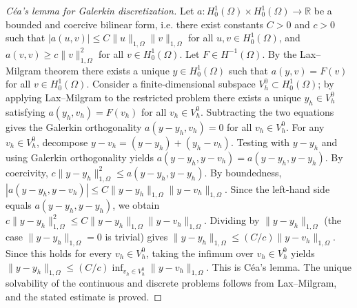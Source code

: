 \documentclass{article}
\begin{document}
\begin{proof}[C\'ea's lemma for Galerkin discretization]
Let $a: H^1_0(\Omega) \times H^1_0(\Omega) \to \mathbb{R}$ be a bounded and coercive bilinear form, i.e. there exist constants $C > 0$ and $c > 0$ such that $|a(u,v)| \le C \|u\|_{1,\Omega} \|v\|_{1,\Omega}$ for all $u,v \in H^1_0(\Omega)$, and $a(v,v) \ge c \|v\|_{1,\Omega}^2$ for all $v \in H^1_0(\Omega)$. Let $F \in H^{-1}(\Omega)$. By the Lax--Milgram theorem there exists a unique $y \in H^1_0(\Omega)$ such that $a(y,v) = F(v)$ for all $v \in H^1_0(\Omega)$. Consider a finite-dimensional subspace $V^0_h \subset H^1_0(\Omega)$; by applying Lax--Milgram to the restricted problem there exists a unique $y_h \in V^0_h$ satisfying $a(y_h,v_h) = F(v_h)$ for all $v_h \in V^0_h$. Subtracting the two equations gives the Galerkin orthogonality $a(y - y_h, v_h) = 0$ for all $v_h \in V^0_h$. For any $v_h \in V^0_h$, decompose $y - v_h = (y - y_h) + (y_h - v_h)$. Testing with $y - y_h$ and using Galerkin orthogonality yields $a(y - y_h, y - v_h) = a(y - y_h, y - y_h)$. By coercivity, $c \|y - y_h\|_{1,\Omega}^2 \le a(y - y_h, y - y_h)$. By boundedness, $|a(y - y_h, y - v_h)| \le C \|y - y_h\|_{1,\Omega} \|y - v_h\|_{1,\Omega}$. Since the left-hand side equals $a(y - y_h, y - y_h)$, we obtain $c \|y - y_h\|_{1,\Omega}^2 \le C \|y - y_h\|_{1,\Omega} \|y - v_h\|_{1,\Omega}$. Dividing by $\|y - y_h\|_{1,\Omega}$ (the case $\|y - y_h\|_{1,\Omega} = 0$ is trivial) gives $\|y - y_h\|_{1,\Omega} \le (C/c) \|y - v_h\|_{1,\Omega}$. Since this holds for every $v_h \in V^0_h$, taking the infimum over $v_h \in V^0_h$ yields $\|y - y_h\|_{1,\Omega} \le (C/c) \inf_{v_h \in V^0_h} \|y - v_h\|_{1,\Omega}$. This is C\'ea's lemma. The unique solvability of the continuous and discrete problems follows from Lax--Milgram, and the stated estimate is proved.
\end{proof}
\end{document}
